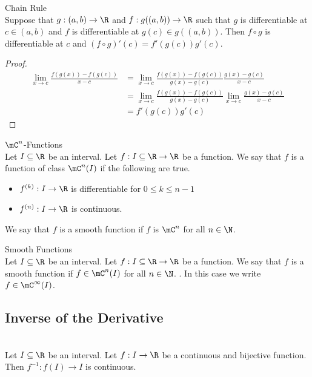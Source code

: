 \documentclass[a4paper]{article}
\begin{document}
\begin{thm}{Chain Rule}{}\\ Suppose that $g:(a,b)\to\R$ and $f:g((a,b))\to\R$ such that $g$ is differentiable at $c\in(a,b)$ and $f$ is differentiable at $g(c)\in g((a,b))$. Then $f\circ g$ is differentiable at $c$ and $(f\circ g)'(c)=f'(g(c))g'(c)$. 
\begin{proof}\\
\begin{align*}
\lim_{x\to c}\frac{f(g(x))-f(g(c))}{x-c}&=\lim_{x\to c}\frac{f(g(x))-f(g(c))}{g(x)-g(c)}\frac{g(x)-g(c)}{x-c}\\
&=\lim_{x\to c}\frac{f(g(x))-f(g(c))}{g(x)-g(c)}\lim_{x\to c}\frac{g(x)-g(c)}{x-c}\\
&=f'(g(c))g'(c)
\end{align*}
\end{proof}
\end{thm}

\begin{defn}{$\mC^n$-Functions}{}\\
Let $I\subseteq\R$ be an interval. Let $f:I\subseteq\R\to\R$ be a function. We say that $f$ is a function of class $\mC^n(I)$ if the following are true. 
\begin{itemize}
\item $f^{(k)}:I\to\R$ is differentiable for $0\leq k\leq n-1$
\item $f^{(n)}:I\to\R$ is continuous. 
\end{itemize}
We say that $f$ is a smooth function if $f$ is $\mC^n$ for all $n\in\N$. 
\end{defn}

\begin{defn}{Smooth Functions}{}\\
Let $I\subseteq\R$ be an interval. Let $f:I\subseteq\R\to\R$ be a function. We say that $f$ is a smooth function if $f\in\mC^n(I)$ for all $n\in\N$. . In this case we write $f\in\mC^\infty(I)$. 
\end{defn}

\subsection{Inverse of the Derivative}
\begin{prp}{}{}\\
Let $I\subseteq\R$ be an interval. Let $f:I\to\R$ be a continuous and bijective function. Then $f^{-1}:f(I)\to I$ is continuous. 
\end{prp}
\end{document}
